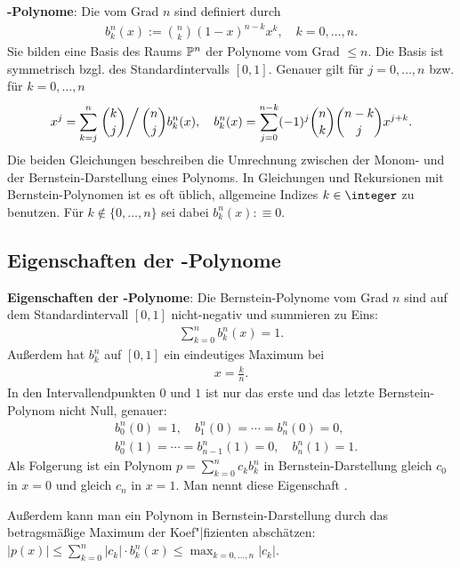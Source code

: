 \textbf{-Polynome}:
Die  vom Grad $n$ sind definiert durch
\begin{align*}
    b_k^n(x) := \binom{n}{k} (1 - x)^{n-k} x^k,\quad
    k = 0, \dotsc, n.
\end{align*}
Sie bilden eine Basis des Raums $\P^n$ der Polynome vom Grad $\le n$.
Die Basis ist symmetrisch bzgl. des Standardintervalls $[0, 1]$.
Genauer gilt für $j = 0, \dotsc, n$ bzw. für $k = 0, \dotsc, n$
\begin{align*}
    x^j = \sum_{k=j}^n \left.\binom{k}{j}\right/\binom{n}{j} b_k^n(x),\quad
    b_k^n(x) = \sum_{j=0}^{n-k} (-1)^j \binom{n}{k} \binom{n-k}{j} x^{j+k}.
\end{align*}
Die beiden Gleichungen beschreiben die Umrechnung zwischen der Monom- und der
Bernstein-Darstellung eines Polynoms.
In Gleichungen und Rekursionen mit Bernstein-Polynomen ist es oft üblich, allgemeine
Indizes $k \in \integer$ zu benutzen.
Für $k \notin \{0, \dotsc, n\}$ sei dabei $b_k^n(x) :\equiv 0$.

\subsection{%
    Eigenschaften der -Polynome%
}

\textbf{Eigenschaften der -Polynome}:
Die Bernstein-Polynome vom Grad $n$ sind auf dem Standardintervall $[0, 1]$ nicht-negativ und
summieren zu Eins:
\begin{align*}
    \sum_{k=0}^n b_k^n(x) = 1.
\end{align*}
Außerdem hat $b_k^n$ auf $[0, 1]$ ein eindeutiges Maximum bei
\begin{align*}
    x = \frac{k}{n}.
\end{align*}
In den Intervallendpunkten $0$ und $1$ ist nur das erste und das letzte Bernstein-Polynom
nicht Null, genauer:
\begin{align*}
    &b_0^n(0) = 1,\quad
    b_1^n(0) = \dotsb = b_n^n(0) = 0,\\
    &b_0^n(1) = \dotsb = b_{n-1}^n(1) = 0,\quad
    b_n^n(1) = 1.
\end{align*}
Als Folgerung ist ein Polynom $p = \sum_{k=0}^n c_k b_k^n$ in Bernstein-Darstellung
gleich $c_0$ in $x = 0$ und gleich $c_n$ in $x = 1$.
Man nennt diese Eigenschaft .

Außerdem kann man ein Polynom in Bernstein-Darstellung durch das betragsmäßige Maximum der
Koef"|fizienten abschätzen:
$|p(x)| \le \sum_{k=0}^n |c_k| \cdot b_k^n(x) \le \max_{k=0,\dotsc,n} |c_k|$.

